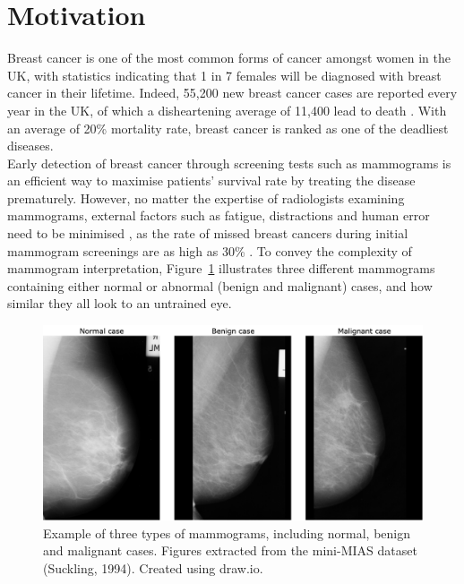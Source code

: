 \section{Motivation}

Breast cancer is one of the most common forms of cancer amongst women in the UK, with statistics indicating that 1 in 7 females will be diagnosed with breast cancer in their lifetime. Indeed, 55,200 new breast cancer cases are reported every year in the UK, of which a disheartening average of 11,400 lead to death \citep{BreastCancerResearchUK}. With an average of 20\% mortality rate, breast cancer is ranked as one of the deadliest diseases.\\

Early detection of breast cancer through screening tests such as mammograms is an efficient way to maximise patients' survival rate by treating the disease prematurely. However, no matter the expertise of radiologists examining mammograms, external factors such as fatigue, distractions and human error need to be minimised \citep{Polat2007}, as the rate of missed breast cancers during initial mammogram screenings  are as high as 30\% \citep{Elter2009}. To convey the complexity of mammogram interpretation, Figure~\ref{fig:introduction-mammogram-examples} illustrates three different mammograms containing either normal or abnormal (benign and malignant) cases, and how similar they all look to an untrained eye.\\

\begin{figure}[ht]
\centerline{\includegraphics[width=\textwidth]{figures/introduction/mammogram examples.png}}
\caption{\label{fig:introduction-mammogram-examples}Example of three types of mammograms, including normal, benign and malignant cases. Figures extracted from the mini-MIAS dataset (Suckling, 1994). Created using draw.io.}
\end{figure}

